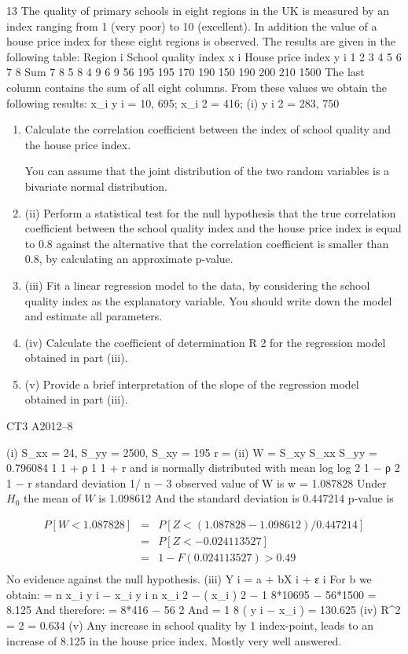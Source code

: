\documentclass[a4paper,12pt]{article}
\begin{document}
13
The quality of primary schools in eight regions in the UK is measured by an index
ranging from 1 (very poor) to 10 (excellent). In addition the value of a house price
index for these eight regions is observed. The results are given in the following table:
Region i
School quality index x i
House price index y i
1
2
3
4
5
6
7
8
Sum
7
8
5
8
4
9
6
9
56
195 195 170 190 150 190 200 210 1500
The last column contains the sum of all eight columns.
From these values we obtain the following results:
\sum x_i y i = 10, 695; \sum x_i 2 = 416;
(i)
\sum y i 2 = 283, 750

\begin{enumerate}
\item Calculate the correlation coefficient between the index of school quality and
the house price index.

You can assume that the joint distribution of the two random variables is a bivariate
normal distribution.
\item (ii) Perform a statistical test for the null hypothesis that the true correlation
coefficient between the school quality index and the house price index is
equal to 0.8 against the alternative that the correlation coefficient is smaller
than 0.8, by calculating an approximate p-value.
\item 
(iii) Fit a linear regression model to the data, by considering the school quality
index as the explanatory variable. You should write down the model and
estimate all parameters.
\item 
(iv) Calculate the coefficient of determination R 2 for the regression model
obtained in part (iii).
\item (v)
Provide a brief interpretation of the slope of the regression model obtained in
part (iii).
\end{enumerate}


CT3 A2012–8


\newpage
(i)
S_{xx} = 24, S_{yy} = 2500, S_{xy} = 195
r =
(ii)
W =
S_{xy}
S_{xx} S_{yy}
= 0.796084
1
1 + ρ
1
1 + r
and
is normally distributed with mean log
log
2
1 − ρ
2
1 − r
standard deviation 1/ n − 3
observed value of W is w = 1.087828
Under $H_{0}$ the mean of $W$ is 1.098612
And the standard deviation is 0.447214
p-value is 

\begin{eqnarray*}
P [ W < 1.087828 ] &=& P [ Z < ( 1.087828 − 1.098612) / 0.447214]\\
&=& P [ Z < − 0.024113527 ] \\ &=& 1 − F (0.024113527) > 0.49\\
\end{eqnarray*}
No evidence against the null hypothesis.
(iii)
Y i = a + bX i + ε i
{
For b we obtain:  = n \sum x_i y i −
\sum x_i \sum y i } { n \sum x_i 2 − ( \sum x_i ) 2 }
− 1
8*10695 − 56*1500
= 8.125
And therefore:  =
8*416 − 56 2
And =
1
8
( \sum y i −  \sum x_i ) = 130.625
(iv) R^{2} \;= 2 = 0.634
(v) Any increase in school quality by 1 index-point, leads to an increase of 8.125
in the house price index.
Mostly very well answered.
\end{document}
